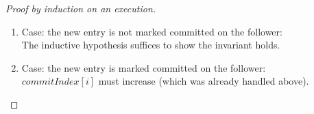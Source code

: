 \begin{proof}[Proof by induction on an execution]
\begin{enumerate}
\begin{enumerate}
\begin{enumerate}
\item Case: the new entry is not marked committed on the follower:\\
The inductive hypothesis suffices to show the invariant holds.
\item Case: the new entry is marked committed on the follower:\\
$commitIndex[i]$ must increase (which was already handled above).
\end{enumerate}
\end{enumerate}
\end{enumerate}
\end{proof}
